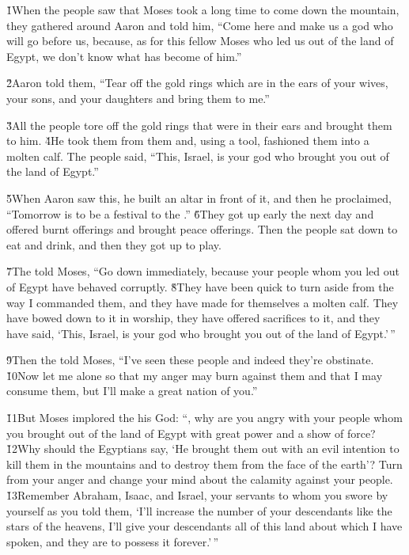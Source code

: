\v{1}When the people saw that Moses took a long time to come down the mountain, they gathered around Aaron and told him, ``Come here and make us a god who will go before us, because, as for this fellow Moses who led us out of the land of Egypt, we don't know what has become of him.''

\v{2}Aaron told them, ``Tear off the gold rings which are in the ears of your wives, your sons, and your daughters and bring them to me.''

\v{3}All the people tore off the gold rings that were in their ears and brought them to him. \v{4}He took them from them and, using a tool, fashioned them into a molten calf. The people said, ``This, Israel, is your god who brought you out of the land of Egypt.''

\v{5}When Aaron saw this, he built an altar in front of it, and then he proclaimed, ``Tomorrow is to be a festival to the .'' \v{6}They got up early the next day and offered burnt offerings and brought peace offerings. Then the people sat down to eat and drink, and then they got up to play.

\v{7}The  told Moses, ``Go down immediately, because your people whom you led out of Egypt have behaved corruptly. \v{8}They have been quick to turn aside from the way I commanded them, and they have made for themselves a molten calf. They have bowed down to it in worship, they have offered sacrifices to it, and they have said, `This, Israel, is your god who brought you out of the land of Egypt.'\,''

\v{9}Then the  told Moses, ``I've seen these people and indeed they're obstinate. \v{10}Now let me alone so that my anger may burn against them and that I may consume them, but I'll make a great nation of you.''

\v{11}But Moses implored the  his God: ``, why are you angry with your people whom you brought out of the land of Egypt with great power and a show of force? \v{12}Why should the Egyptians say, `He brought them out with an evil intention to kill them in the mountains and to destroy them from the face of the earth'? Turn from your anger and change your mind about the calamity against your people. \v{13}Remember Abraham, Isaac, and Israel, your servants to whom you swore by yourself as you told them, `I'll increase the number of your descendants like the stars of the heavens, I'll give your descendants all of this land about which I have spoken, and they are to possess it forever.'\,''

